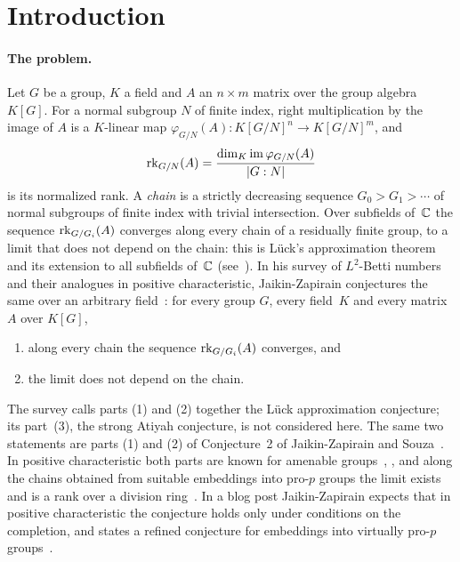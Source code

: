 \section{Introduction}\label{sec:intro}

\paragraph{The problem.} Let $G$ be a group, $K$ a field and $A$ an $n\times m$ matrix over the group algebra $K[G]$. For
a normal subgroup $N$ of finite index, right multiplication by the image of $A$ is a $K$-linear map
$\varphi_{G/N}(A)\colon K[G/N]^n\to K[G/N]^m$, and
\[
  \operatorname{rk}_{G/N}(A)=\frac{\dim_K\operatorname{im}\varphi_{G/N}(A)}{\lvert G:N \rvert}
\]
is its normalized rank. A \emph{chain} is a strictly decreasing sequence $G_0>G_1>\cdots$ of normal subgroups of finite
index with trivial intersection. Over subfields of~$\mathbb{C}$ the sequence $\operatorname{rk}_{G/G_i}(A)$ converges along every chain of a
residually finite group, to a limit that does not depend on the chain: this is L\"uck's approximation
theorem~\cite{Luck1994} and its extension to all subfields of~$\mathbb{C}$ (see~\cite[Section~1 and Theorem~10.1]{JaikinSurvey2019}).
In his survey of $L^2$-Betti numbers and their analogues in positive characteristic, Jaikin-Zapirain conjectures the
same over an arbitrary field~\cite[Conjecture~1.2]{JaikinSurvey2019}: for every group $G$, every field~$K$ and every
matrix~$A$ over $K[G]$,
\begin{enumerate}[label=(\arabic*)]
\item along every chain the sequence $\operatorname{rk}_{G/G_i}(A)$ converges, and
\item the limit does not depend on the chain.
\end{enumerate}
The survey calls parts (1) and (2) together the L\"uck approximation conjecture; its part~(3), the strong Atiyah
conjecture, is not considered here. The same two statements are parts (1) and (2) of Conjecture~2 of
Jaikin-Zapirain and Souza~\cite{JaikinSouza2026}. In positive characteristic both parts are known for amenable
groups~\cite[Section~1]{JaikinSurvey2019}, \cite[Section~8]{JaikinSouza2026}, and along the chains obtained from suitable
embeddings into pro-$p$ groups the limit exists and is a rank over a division ring~\cite[Theorem~8.1]{JaikinSouza2026}.
In a blog post Jaikin-Zapirain expects that in positive characteristic the conjecture holds only under conditions on the
completion, and states a refined conjecture for embeddings into virtually pro-$p$ groups~\cite{JaikinBlog2024}.

